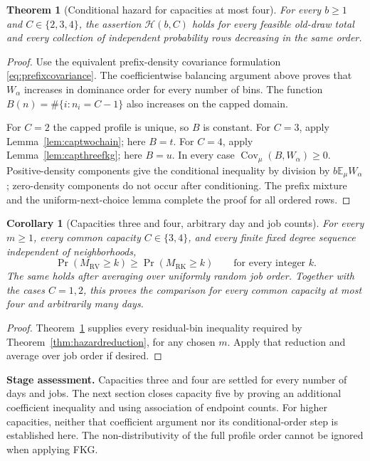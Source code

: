 \documentclass[11pt]{article}
\newtheorem{theorem}{Theorem}
\newtheorem{corollary}{Corollary}
\newcommand{\RV}{\mathrm{RV}}
\newcommand{\RK}{\mathrm{RK}}
\begin{document}
\begin{theorem}[Conditional hazard for capacities at most four]\label{thm:smallcapacityhazard}
For every $b\geq1$ and $C\in\{2,3,4\}$, the assertion
$\mathcal H(b,C)$ holds for every feasible old-draw total and
every collection of independent probability rows decreasing in
the same order.
\end{theorem}
\begin{proof}
Use the equivalent prefix-density covariance formulation
\eqref{eq:prefixcovariance}. The coefficientwise balancing argument
above proves that $W_\alpha$ increases in dominance order for
every number of bins. The function $B(n)=\#\{i:n_i=C-1\}$
also increases on the capped domain.

For $C=2$ the capped profile is unique, so $B$ is constant.
For $C=3$, apply Lemma~\ref{lem:captwochain}; here $B=t$.
For $C=4$, apply Lemma~\ref{lem:capthreefkg}; here $B=u$.
In every case $\operatorname{Cov}_\mu(B,W_\alpha)\geq0$.
Positive-density components give the conditional inequality by
division by $b\mathbb E_\mu W_\alpha$; zero-density components
do not occur after conditioning. The prefix mixture and the
uniform-next-choice lemma complete the proof for all ordered rows.
\end{proof}

\begin{corollary}[Capacities three and four, arbitrary day and job counts]\label{cor:capacityfour}
For every $m\geq1$, every common capacity $C\in\{3,4\}$,
and every finite fixed degree sequence independent of neighborhoods,
\[
 \Pr(M_\RV\geq k)\geq\Pr(M_\RK\geq k)
 \qquad\text{for every integer }k.
\]
The same holds after averaging over uniformly random job order.
Together with the cases $C=1,2$, this proves the comparison for
every common capacity at most four and arbitrarily many days.
\end{corollary}
\begin{proof}
Theorem~\ref{thm:smallcapacityhazard} supplies every residual-bin
inequality required by Theorem~\ref{thm:hazardreduction}, for any
chosen $m$. Apply that reduction and average over job order if desired.
\end{proof}

\noindent\textbf{Stage assessment.}
Capacities three and four are settled for every number of days and
jobs. The next section closes capacity five by proving an additional
coefficient inequality and using association of endpoint counts.
For higher capacities, neither that coefficient argument nor its
conditional-order step is established here. The non-distributivity
of the full profile order cannot be ignored when applying FKG.
\end{document}
